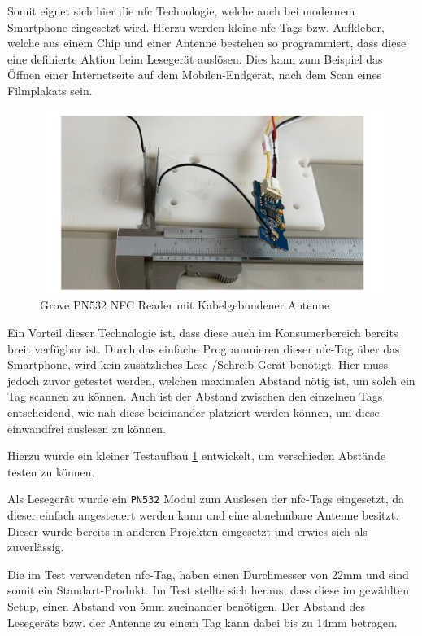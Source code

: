 Somit eignet sich hier die \gls{nfc} Technologie, welche auch bei
modernem Smartphone eingesetzt wird. Hierzu werden kleine \gls{nfc}-Tags
bzw. Aufkleber, welche aus einem Chip und einer Antenne bestehen so
programmiert, dass diese eine definierte Aktion beim Lesegerät auslösen.
Dies kann zum Beispiel das Öffnen einer Internetseite auf dem
Mobilen-Endgerät, nach dem Scan eines Filmplakats sein.

\begin{figure}
\centering
\includegraphics{images/ATC_nfc_range_test.png}
\caption{Grove PN532 NFC Reader mit Kabelgebundener Antenne
\label{ATC_nfc_range_test}}
\end{figure}

Ein Vorteil dieser Technologie ist, dass diese auch im Konsumerbereich
bereits breit verfügbar ist. Durch das einfache Programmieren dieser
\gls{nfc}-Tag über das Smartphone, wird kein zusätzliches
Lese-/Schreib-Gerät benötigt. Hier muss jedoch zuvor getestet werden,
welchen maximalen Abstand nötig ist, um solch ein Tag scannen zu können.
Auch ist der Abstand zwischen den einzelnen Tags entscheidend, wie nah
diese beieinander platziert werden können, um diese einwandfrei auslesen
zu können.

Hierzu wurde ein kleiner Testaufbau \ref{ATC_nfc_range_test} entwickelt,
um verschieden Abstände testen zu können.

Als Lesegerät wurde ein \passthrough{\lstinline!PN532!} Modul zum
Auslesen der \gls{nfc}-Tags eingesetzt, da dieser einfach angesteuert
werden kann und eine abnehmbare Antenne besitzt. Dieser wurde bereits in
anderen Projekten eingesetzt und erwies sich als zuverlässig.

Die im Test verwendeten \gls{nfc}-Tag, haben einen Durchmesser von 22mm
und sind somit ein Standart-Produkt. Im Test stellte sich heraus, dass
diese im gewählten Setup, einen Abstand von 5mm zueinander benötigen.
Der Abstand des Lesegeräts bzw. der Antenne zu einem Tag kann dabei bis
zu 14mm betragen.

